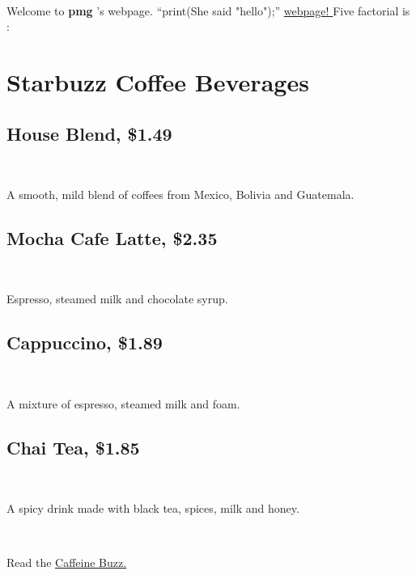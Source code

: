 \documentclass{article}
\begin{document}

~

\noindent Welcome to \textbf{pmg }'s webpage. ``print(She said "hello");'' \href{http://www.douban.com}{\underline{webpage! }}Five factorial is : \section*{Starbuzz Coffee Beverages }\subsection*{House Blend, \$1.49 }
~

\noindent A smooth, mild blend of coffees from Mexico, Bolivia and Guatemala. 
\subsection*{Mocha Cafe Latte, \$2.35 }
~

\noindent Espresso, steamed milk and chocolate syrup. 
\subsection*{Cappuccino, \$1.89 }
~

\noindent A mixture of espresso, steamed milk and foam. 
\subsection*{Chai Tea, \$1.85 }
~

\noindent A spicy drink made with black tea, spices, milk and honey. 

~

\noindent Read the \href{./mission.html}{\underline{Caffeine Buzz. }}
\end{document}
